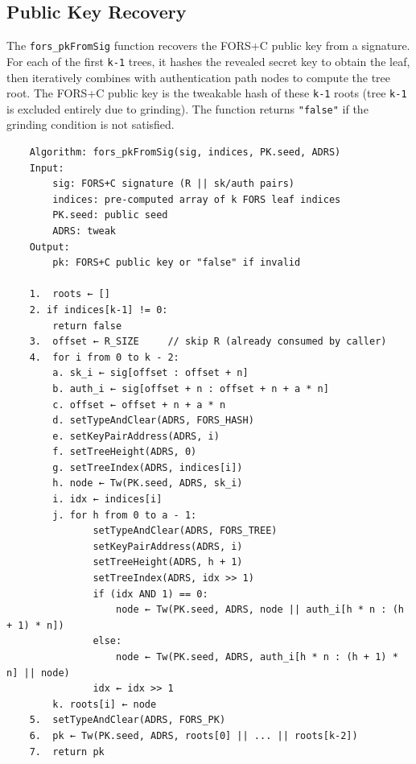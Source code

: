 \subsection{Public Key Recovery}
The \texttt{fors\_pkFromSig} function recovers the FORS+C public key from a signature. For each of the first \texttt{k-1} trees, it hashes the revealed secret key to obtain the leaf, then iteratively combines with authentication path nodes to compute the tree root. The FORS+C public key is the tweakable hash of these \texttt{k-1} roots (tree \texttt{k-1} is excluded entirely due to grinding). The function returns \texttt{"false"} if the grinding condition is not satisfied.
\begin{verbatim}
    Algorithm: fors_pkFromSig(sig, indices, PK.seed, ADRS)
    Input:
        sig: FORS+C signature (R || sk/auth pairs)
        indices: pre-computed array of k FORS leaf indices
        PK.seed: public seed
        ADRS: tweak
    Output:
        pk: FORS+C public key or "false" if invalid
    
    1.  roots ← []
    2. if indices[k-1] != 0:
        return false
    3.  offset ← R_SIZE     // skip R (already consumed by caller)
    4.  for i from 0 to k - 2:
        a. sk_i ← sig[offset : offset + n]
        b. auth_i ← sig[offset + n : offset + n + a * n]
        c. offset ← offset + n + a * n
        d. setTypeAndClear(ADRS, FORS_HASH)
        e. setKeyPairAddress(ADRS, i)
        f. setTreeHeight(ADRS, 0)
        g. setTreeIndex(ADRS, indices[i])
        h. node ← Tw(PK.seed, ADRS, sk_i)
        i. idx ← indices[i]
        j. for h from 0 to a - 1:
               setTypeAndClear(ADRS, FORS_TREE)
               setKeyPairAddress(ADRS, i)
               setTreeHeight(ADRS, h + 1)
               setTreeIndex(ADRS, idx >> 1)
               if (idx AND 1) == 0:
                   node ← Tw(PK.seed, ADRS, node || auth_i[h * n : (h + 1) * n])
               else:
                   node ← Tw(PK.seed, ADRS, auth_i[h * n : (h + 1) * n] || node)
               idx ← idx >> 1
        k. roots[i] ← node
    5.  setTypeAndClear(ADRS, FORS_PK)
    6.  pk ← Tw(PK.seed, ADRS, roots[0] || ... || roots[k-2])
    7.  return pk
\end{verbatim}